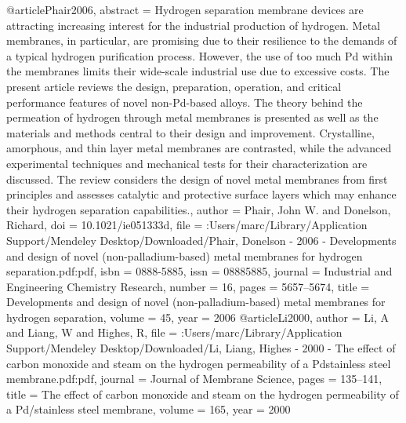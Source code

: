 @article{Phair2006,
abstract = {Hydrogen separation membrane devices are attracting increasing interest for the industrial production of hydrogen. Metal membranes, in particular, are promising due to their resilience to the demands of a typical hydrogen purification process. However, the use of too much Pd within the membranes limits their wide-scale industrial use due to excessive costs. The present article reviews the design, preparation, operation, and critical performance features of novel non-Pd-based alloys. The theory behind the permeation of hydrogen through metal membranes is presented as well as the materials and methods central to their design and improvement. Crystalline, amorphous, and thin layer metal membranes are contrasted, while the advanced experimental techniques and mechanical tests for their characterization are discussed. The review considers the design of novel metal membranes from first principles and assesses catalytic and protective surface layers which may enhance their hydrogen separation capabilities.},
author = {Phair, John W. and Donelson, Richard},
doi = {10.1021/ie051333d},
file = {:Users/marc/Library/Application Support/Mendeley Desktop/Downloaded/Phair, Donelson - 2006 - Developments and design of novel (non-palladium-based) metal membranes for hydrogen separation.pdf:pdf},
isbn = {0888-5885},
issn = {08885885},
journal = {Industrial and Engineering Chemistry Research},
number = {16},
pages = {5657--5674},
title = {{Developments and design of novel (non-palladium-based) metal membranes for hydrogen separation}},
volume = {45},
year = {2006}
}
@article{Li2000,
author = {Li, A and Liang, W and Highes, R},
file = {:Users/marc/Library/Application Support/Mendeley Desktop/Downloaded/Li, Liang, Highes - 2000 - The effect of carbon monoxide and steam on the hydrogen permeability of a Pdstainless steel membrane.pdf:pdf},
journal = {Journal of Membrane Science},
pages = {135--141},
title = {{The effect of carbon monoxide and steam on the hydrogen permeability of a Pd/stainless steel membrane}},
volume = {165},
year = {2000}
}
